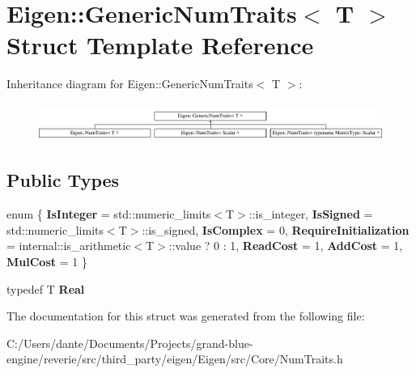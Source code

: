 \hypertarget{struct_eigen_1_1_generic_num_traits}{}\section{Eigen\+::Generic\+Num\+Traits$<$ T $>$ Struct Template Reference}
\label{struct_eigen_1_1_generic_num_traits}
Inheritance diagram for Eigen\+::Generic\+Num\+Traits$<$ T $>$\+:\begin{figure}[H]
\begin{center}
\leavevmode
\includegraphics[height=1.232123cm]{struct_eigen_1_1_generic_num_traits}
\end{center}
\end{figure}
\subsection*{Public Types}
\begin{DoxyCompactItemize}
\item 
\mbox{\label{struct_eigen_1_1_generic_num_traits_a92c790a02ca9da2135cec543bab1b55c}} 
enum \{ \newline
{\bfseries Is\+Integer} = std\+::numeric\+\_\+limits$<$T$>$\+::is\+\_\+integer, 
{\bfseries Is\+Signed} = std\+::numeric\+\_\+limits$<$T$>$\+::is\+\_\+signed, 
{\bfseries Is\+Complex} = 0, 
{\bfseries Require\+Initialization} = internal\+::is\+\_\+arithmetic$<$T$>$\+::value ? 0 \+: 1, 
\newline
{\bfseries Read\+Cost} = 1, 
{\bfseries Add\+Cost} = 1, 
{\bfseries Mul\+Cost} = 1
 \}
\item 
\mbox{\label{struct_eigen_1_1_generic_num_traits_abca8573812593670795c41f22aa9d5e2}} 
typedef T {\bfseries Real}
\end{DoxyCompactItemize}


The documentation for this struct was generated from the following file\+:\begin{DoxyCompactItemize}
\item 
C\+:/\+Users/dante/\+Documents/\+Projects/grand-\/blue-\/engine/reverie/src/third\+\_\+party/eigen/\+Eigen/src/\+Core/Num\+Traits.\+h\end{DoxyCompactItemize}
